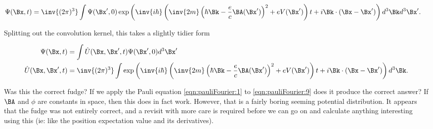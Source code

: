 \begin{align}\label{eqn:pauliFourier:9}
\Psi(\Bx, t) &= \inv{(2 \pi)^3} \int 
\Psi(\Bx', 0) \exp\left(
\inv{i \hbar} \left( \inv{2m} \left( \hbar \Bk - \frac{e}{c} \BA(\Bx') \right)^2 + e V(\Bx') \right) t
+ i \Bk \cdot (\Bx - \Bx')
\right)
d^3 \Bk d^3 \Bx'.
\end{align}

Splitting out the convolution kernel, this takes a slightly tidier form

\begin{subequations}
\begin{align}\label{eqn:pauliFourier:10}
\Psi(\Bx, t) &= 
\int \hat{U}(\Bx, \Bx', t) \Psi(\Bx', 0) d^3 \Bx' \\
\hat{U}(\Bx, \Bx', t) &= 
\inv{(2 \pi)^3} 
\int
\exp\left(
\inv{i \hbar} \left( \inv{2m} \left( \hbar \Bk - \frac{e}{c} \BA(\Bx') \right)^2 + e V(\Bx') \right) t
+ i \Bk \cdot (\Bx - \Bx')
\right)
d^3 \Bk.
\end{align}
\end{subequations}

Was this the correct fudge?  If we apply the Pauli equation \ref{eqn:pauliFourier:1} to \ref{eqn:pauliFourier:9} does it produce the correct answer?  If $\BA$ and $\phi$ are constants in space, then this does in fact work.  However, that is a fairly boring seeming potential distribution.  It appears that the fudge was not entirely correct, and a revisit with more care is required before we can go on and calculate anything interesting using this (ie: like the position expectation value and its derivatives).

\EndArticle
